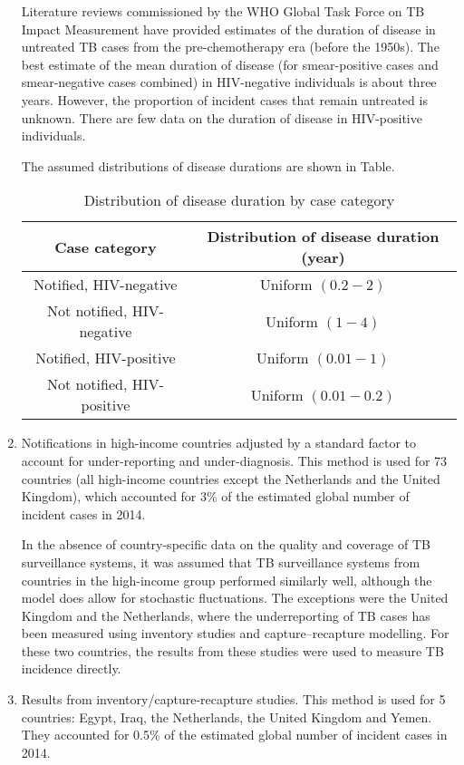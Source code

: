 \begin{enumerate}
Literature reviews commissioned by the WHO Global Task Force on TB Impact Measurement have provided estimates of the duration of disease in untreated TB cases from the pre-chemotherapy era (before the 1950s). The best estimate of the mean duration of disease (for smear-positive cases and smear-negative cases combined) in HIV-negative individuals is about three years. However, the proportion of incident cases that remain untreated is unknown. There are few data on the duration of disease in HIV-positive individuals. 

The assumed distributions of disease durations are shown in Table.

\begin{table} 
    \begin{tabular}{ c c }
        Case category & Distribution of disease duration (year) \\ \hline
        Notified, HIV-negative & Uniform $(0.2 - 2)$ \\ 
        Not notified, HIV-negative & Uniform $(1 - 4)$ \\ 
        Notified, HIV-positive & Uniform $(0.01 - 1)$ \\ 
        Not notified, HIV-positive & Uniform $(0.01 - 0.2)$ \\ \hline
    \end{tabular} 
    \caption{Distribution of disease duration by case category} 
\end{table}

\item {Notifications in high-income countries adjusted by a standard factor to account for under-reporting and under-diagnosis.} This method is used for 73 countries (all high-income countries except the Netherlands and the United Kingdom), which accounted for 3\% of the estimated global number of incident cases in 2014.

In the absence of country-specific data on the quality and coverage of TB surveillance systems, it was assumed that TB surveillance systems from countries in the high-income group performed similarly well, although the model does allow for stochastic fluctuations. The exceptions were the United Kingdom and the Netherlands, where the underreporting of TB cases has been measured using inventory studies and capture–recapture modelling\cite{Anderson2010}\cite{17156496}. For these two countries, the results from these studies were used to measure TB incidence directly.


\item {Results from inventory/capture-recapture studies.} This method is used for 5 countries: Egypt, Iraq, the Netherlands, the United Kingdom and Yemen. They accounted for 0.5\% of the estimated global number of incident cases in 2014. 
\end{enumerate}




  
  
  
  
  
  
  
  